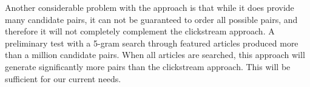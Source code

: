 
Another considerable problem with the approach is that while it does provide many candidate pairs, it can not be guaranteed to order all possible pairs, and therefore it will not completely complement the clickstream approach. A preliminary test with a 5-gram search through featured articles produced more than a million candidate pairs. When all articles are searched, this approach will generate significantly more pairs than the clickstream approach. This will be sufficient for our current needs.


